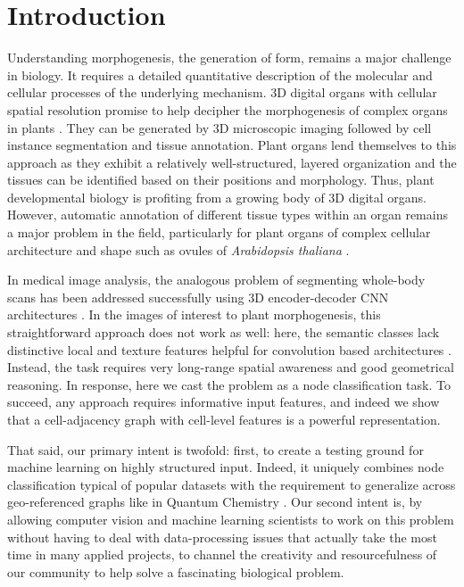 \documentclass[10pt,twocolumn,letterpaper]{article}
\begin{document}
\section{Introduction}
\label{sec:intro}
Understanding morphogenesis, the generation of form, remains a major challenge in biology. It requires a detailed quantitative description of the molecular and cellular processes of the underlying mechanism. 3D digital organs with cellular spatial resolution promise to help decipher the morphogenesis of complex organs in plants \cite{montenegro2015digital, willis2016cell, refahi2021multiscale, hong2018heterogeneity}. They can be generated by 3D microscopic imaging followed by cell instance segmentation and tissue annotation.
Plant organs lend themselves to this approach as they exhibit a relatively well-structured, layered organization and the tissues can be identified based on their positions and morphology. Thus, plant developmental biology is profiting from a growing body of 3D digital organs. However, automatic annotation \cite{montenegro2015digital, schmidt2014irocs, montenegro20193dcellatlas} of different tissue types within an organ remains a major problem in the field, particularly for plant organs of complex cellular architecture and shape such as ovules of \textit{Arabidopsis thaliana} \cite{vijayan2021digital}.


In medical image analysis, the analogous problem of segmenting whole-body scans has been addressed successfully using 3D encoder-decoder CNN architectures \cite{weston2019automated, lee2017pixel}. In the images of interest to plant morphogenesis, this straightforward approach does not work as well: here, the semantic classes lack distinctive local and texture features helpful for convolution based architectures \cite{geirhos2018imagenet}. Instead, the task requires very long-range spatial awareness and good geometrical reasoning. In response, here we cast the problem as a node classification task. To succeed, any approach requires informative input features, and indeed we show that a cell-adjacency graph with cell-level features is a powerful representation.

That said, our primary intent is twofold: first, to create a testing ground for machine learning on highly structured input.
Indeed, it uniquely combines node classification typical of popular datasets \cite{mccallum2000automating, giles1998citeseer, sen2008collective} with the requirement to generalize across geo-referenced graphs like in Quantum Chemistry \cite{rupp, blum, wu2018moleculenet, gomez2018automatic}.
Our second intent is, by allowing computer vision and machine learning scientists to work on this problem without having to deal with data-processing issues that actually take the most time in many applied projects, to channel the creativity and resourcefulness of our community to help solve a fascinating biological problem. 
\end{document}

